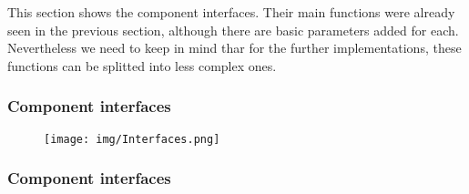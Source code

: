 	This section shows the component interfaces. Their main functions were already seen in the previous section, although there are basic parameters added for each. Nevertheless we need to keep in mind thar for the further implementations, these functions can be splitted into less complex ones.  
	\subsubsection{Component interfaces}	
		\begin{figure}[h]
			\texttt{[image: img/Interfaces.png]}
		\end{figure}
		
			
	\subsubsection{Component interfaces}